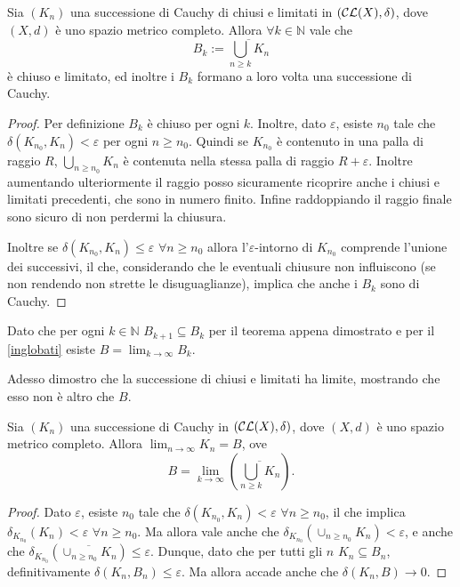 \begin{theorem}
Sia $(K_n)$ una successione di Cauchy di chiusi e limitati in $\left (\mathcal{CL}(X),\delta\right  ) $, dove $\left (X, d\right )$ è uno spazio metrico completo. Allora $\forall k \in \mathbb{N}$ vale che
\begin{equation*}
B_k:=\overline{\bigcup_{n\geq k} K_n}
\end{equation*}
è chiuso e limitato, ed inoltre i $B_k$ formano a loro volta una successione di Cauchy.
\end{theorem}

\begin{proof}
 Per definizione $B_k$ è chiuso per ogni $k$. Inoltre, dato $\varepsilon$, esiste $n_0$ tale che $\delta\left (K_{n_0}, K_n\right )< \varepsilon$ per ogni $n\geq n_0$. Quindi se $K_{n_0}$ è contenuto in una palla di raggio $R$, $\bigcup_{n\geq n_0} K_n$ è contenuta nella stessa palla di raggio $R+\varepsilon$. Inoltre aumentando ulteriormente il raggio posso sicuramente ricoprire anche i chiusi e limitati precedenti, che sono in numero finito. Infine raddoppiando il raggio finale sono sicuro di non perdermi la chiusura.

Inoltre se $\delta\left  (K_{n_0}, K_n\right )\leq \varepsilon$ $\forall n \geq n_0$  allora l'$\varepsilon$-intorno di $K_{n_0}$ comprende l'unione dei successivi, il che, considerando che le eventuali chiusure non influiscono (se non rendendo non strette le disuguaglianze), implica che anche i $B_k$ sono di Cauchy.
\end{proof}

Dato che per ogni $k\in \mathbb{N}$ $B_{k+1}\subseteq B_k$ per il teorema appena dimostrato e per il \cref{inglobati} esiste $B=\lim_{k \to \infty} B_k$.

Adesso dimostro che la successione di chiusi e limitati ha limite, mostrando che esso non è altro che $B$.

\begin{theorem}
Sia $\left (K_n\right )$ una successione di Cauchy in $\left (\mathcal{CL}(X),\delta \right ) $, dove $\left (X, d\right )$ è uno spazio metrico completo. Allora $\lim_{n \to \infty}K_n=B$, ove
\begin{equation*}
B=\lim_{k \to \infty} \left(\overline{\bigcup_{n\geq k} K_n} \right).
\end{equation*}
\end{theorem}

\begin{proof}
Dato $\varepsilon$, esiste $n_0$ tale che $\delta\left  (K_{n_0}, K_n\right )< \varepsilon$ $\forall n\geq n_0$, il che implica $\delta _{K_{n_0}}\left  (K_n\right )<\varepsilon$ $\forall n\geq n_0$. Ma allora vale anche che $\delta _{K_{n_0}}\left  (\cup_{n\geq n_0} K_n\right )<\varepsilon$, e anche che $\delta _{K_{n_0}}\left  (\overline {\cup_{n\geq n_0} K_n} \right ) \leq \varepsilon$. Dunque, dato che per tutti gli $n$ $K_n \subseteq B_n$,  definitivamente $\delta\left  (K_n, B_n\right ) \leq \varepsilon$. Ma allora accade anche che $\delta\left  (K_n, B\right ) \to 0$.
\end{proof}

